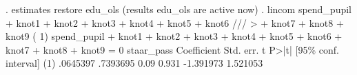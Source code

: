 . estimates restore edu_ols
(results edu_ols are active now)
{\smallskip}
. lincom spend_pupil + knot1 + knot2 + knot3 + knot4 + knot5 + knot6 ///
>     + knot7 + knot8 + knot9
{\smallskip}
 ( 1)  spend_pupil + knot1 + knot2 + knot3 + knot4 + knot5 + knot6 + knot7 +
       knot8 + knot9 = 0
{\smallskip}
  staar_pass {\VBAR} Coefficient  Std. err.      t    P>|t|     [95\% conf. interval]
         (1) {\VBAR}   .0645397   .7393695     0.09   0.931    -1.391973    1.521053
